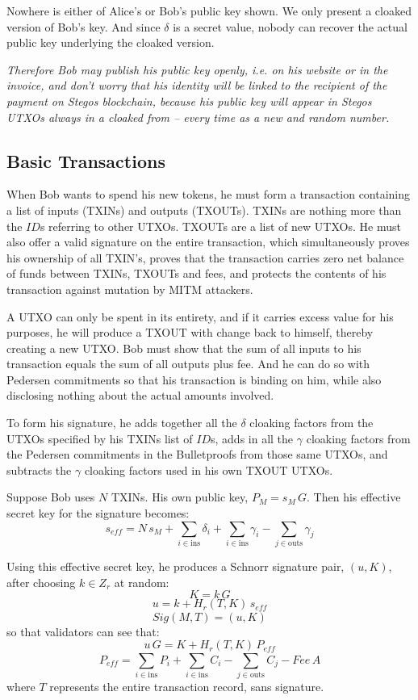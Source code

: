 \documentclass[a4paper, 10pt, conference]{ieeeconf}
\begin{document}
Nowhere is either of Alice's or Bob's public key shown. We only present a cloaked version of Bob's key. And since $\delta$ is a secret value, nobody can recover the actual public key underlying the cloaked version. 

\textit{Therefore Bob may publish his public key openly, i.e. on his website or in the invoice, and don't worry that his identity will be linked to the recipient of the payment on Stegos blockchain, because his public key will appear in Stegos UTXOs always in a cloaked from -- every time as a new and random number.}

\subsection{Basic Transactions}

When Bob wants to spend his new tokens, he must form a transaction containing a list of inputs (TXINs) and outputs (TXOUTs). TXINs are nothing more than the $\mathit{ID}$s referring to other UTXOs. TXOUTs are a list of new UTXOs. He must also offer a valid signature on the entire transaction, which simultaneously proves his ownership of all TXIN's, proves that the transaction carries zero net balance of funds between TXINs, TXOUTs and fees, and protects the contents of his transaction against mutation by MITM attackers.

A UTXO can only be spent in its entirety, and if it carries excess value for his purposes, he will produce a TXOUT with change back to himself, thereby creating a new UTXO. Bob must show that the sum of all inputs to his transaction equals the sum of all outputs plus fee. And he can do so with Pedersen commitments so that his transaction is binding on him, while also disclosing nothing about the actual amounts involved.

To form his signature, he adds together all the $\delta$ cloaking factors from the UTXOs specified by his TXINs list of $\mathit{ID}$s, adds in all the $\gamma$ cloaking factors from the Pedersen commitments in the Bulletproofs from those same UTXOs, and subtracts the $\gamma$ cloaking factors used in his own TXOUT UTXOs. 

Suppose Bob uses $N$ TXINs. His own public key, $P_M = s_M \, G$. Then his effective secret key for the signature becomes:
$$s_{\mathit{eff}} = N \, s_M + \sum_{i \in \text{ins}} {\delta_i} + \sum_{i \in \text{ins}}{\gamma_i} - \sum_{j \in \text{outs}}{ \gamma_j}$$

Using this effective secret key, he produces a Schnorr signature pair, $(u, K)$, after choosing $k \in Z_r$ at random:
$$K = k \, G$$
$$u = k + H_r(T, K) \, s_{\mathit{eff}}$$
$$Sig(M,T) = (u, K)$$
so that validators can see that:
$$u \, G = K + H_r(T, K) \, P_{\mathit{eff}}$$
$$P_{\mathit{eff}} = \sum_{i \in \text{ins}}{P_i} + \sum_{i \in \text{ins}}{C_i} - \sum_{j \in \text{outs}}{C_j} - \mathit{Fee} \, A$$
where $T$ represents the entire transaction record, sans signature.
\end{document}
